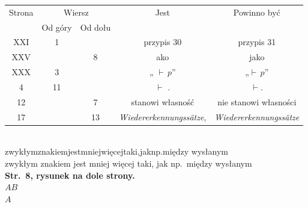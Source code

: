 \documentclass[a4paper,11pt]{article}
\numberwithin{equation}{section}
\begin{document}













\newpage



\begin{center}

  \begin{tabular}{|c|c|c|c|c|}
    \hline
    Strona & \multicolumn{2}{c|}{Wiersz} & Jest
                              & Powinno być \\ \cline{2-3}
    & Od góry & Od dołu & & \\
    \hline
    XXI & \hphantom{0}1 & & przypis 30 & przypis 31 \\
    XXV & & \hphantom{0}8 & \raisebox{-0.2em}{j}ako & jako \\
    XXX & \hphantom{0}3 & & „ $\vdash \, p$” & „$\vdash \, p$” \\
    \hphantom{0}4 & 11 & & $\vdash$ . & $\vdash$. \\
    12 & & \hphantom{0}7 & stanowi własność
    & nie stanowi własności \\
    17 & & 13 & \textit{Wiedererkennungss\"{a}tze},
    & \textit{Wiedererkennungss\"{a}tze} \\
    \hline
  \end{tabular}

\end{center}

\VerSpaceTwo


\noindent
{} \\
\Jest zwykłymznakiemjestmniejwięcejtaki,jaknp.między \hspace{-0.5em}
wysłanym \\
\PowinnoByc zwykłym znakiem jest mniej więcej taki, jak np.~między
wysłanym \\
\textbf{Str.~8, rysunek na dole strony.} \\
\Jest $AB$ \\
\PowinnoByc $A$ \\
\end{document}
